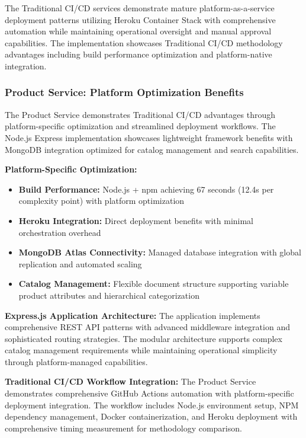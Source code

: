 The Traditional CI/CD services demonstrate mature platform-as-a-service deployment patterns utilizing Heroku Container Stack with comprehensive automation while maintaining operational oversight and manual approval capabilities. The implementation showcases Traditional CI/CD methodology advantages including build performance optimization and platform-native integration.

\subsubsection{Product Service: Platform Optimization Benefits}

The Product Service demonstrates Traditional CI/CD advantages through platform-specific optimization and streamlined deployment workflows. The Node.js Express implementation showcases lightweight framework benefits with MongoDB integration optimized for catalog management and search capabilities.

\textbf{Platform-Specific Optimization:}
\begin{itemize}
\item \textbf{Build Performance:} Node.js + npm achieving 67 seconds (12.4s per complexity point) with platform optimization
\item \textbf{Heroku Integration:} Direct deployment benefits with minimal orchestration overhead
\item \textbf{MongoDB Atlas Connectivity:} Managed database integration with global replication and automated scaling
\item \textbf{Catalog Management:} Flexible document structure supporting variable product attributes and hierarchical categorization
\end{itemize}

\textbf{Express.js Application Architecture:}
The application implements comprehensive REST API patterns with advanced middleware integration and sophisticated routing strategies. The modular architecture supports complex catalog management requirements while maintaining operational simplicity through platform-managed capabilities.

\textbf{Traditional CI/CD Workflow Integration:}
The Product Service demonstrates comprehensive GitHub Actions automation with platform-specific deployment integration. The workflow includes Node.js environment setup, NPM dependency management, Docker containerization, and Heroku deployment with comprehensive timing measurement for methodology comparison.

